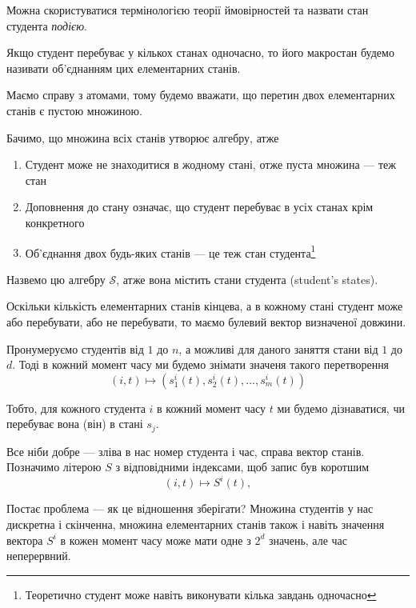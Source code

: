 Можна скористуватися термінологією теорії ймовірностей та назвати стан
студента \textit{подією}.

Якщо студент перебуває у кількох станах одночасно, то його макростан будемо
називати об’єднанням цих елементарних станів.

Маємо справу з атомами, тому будемо вважати, що перетин двох елементарних
станів є пустою множиною.

Бачимо, що множина всіх станів утворює алгебру, атже
\begin{enumerate}
  \item
    Студент може не знаходитися в жодному стані, отже пуста множина --- теж
    стан
  \item
    Доповнення до стану означає, що студент перебуває в усіх станах крім
    конкретного
  \item
    Об’єднання двох будь-яких станів --- це теж стан студента\footnote{
    Теоретично студент може навіть виконувати кілька завдань одночасно}
\end{enumerate}

Назвемо цю алгебру $\mathcal{S}$, атже вона містить стани студента
(student's states).

Оскільки кількість елементарних станів кінцева, а в кожному стані студент
може або перебувати, або не перебувати, то маємо булевий вектор визначеної
довжини.

Пронумеруємо студентів від $1$ до $n$, а можливі для даного заняття стани
від $1$ до $d$.
Тоді в кожний момент часу ми будемо знімати значеня такого перетворення
\begin{equation*}
  \left( i,t \right) \mapsto \left( s_1^i\left( t \right),
    s_2^i\left( t \right), \dots, s_m^i\left( t \right) \right)
\end{equation*}

Тобто, для кожного студента $i$ в кожний момент часу $t$ ми будемо
дізнаватися, чи перебуває вона (він) в стані $s_j$.

Все ніби добре --- зліва в нас номер студента і час, справа вектор станів.
Позначимо літерою $S$ з відповідними індексами, щоб запис був коротшим
\begin{equation*}
  \left( i,t \right) \mapsto S^i\left( t \right),
\end{equation*}

Постає проблема --- як це відношення зберігати?
Множина студентів у нас дискретна і скінченна, множина елементарних станів
також і навіть значення вектора $S^i$ в кожен момент часу може мати одне з
$2^d$ значень, але час неперервний.


